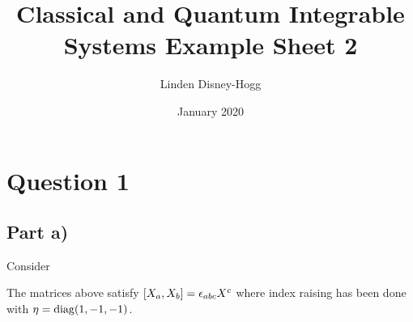 \documentclass{article}
\title{Classical and Quantum Integrable Systems Example Sheet 2}
\author{Linden Disney-Hogg}
\date{January 2020}
\begin{document}
\maketitle
\tableofcontents

\section{Question 1}

\subsection{Part a)}
Consider 
\begin{prop}
The matrices above satisfy $\comm[X_a]{X_b} = \eps_{abc} X^c$ where index raising has been done with $\eta = \diag(1,-1,-1)$.
\end{prop}
\end{document}
